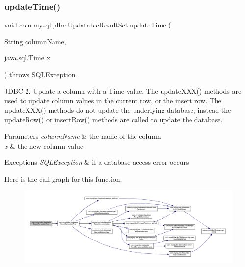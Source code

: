 \subsubsection{\texorpdfstring{update\+Time()}{updateTime()}\hspace{0.1cm}{\footnotesize\ttfamily [2/2]}}
{\footnotesize\ttfamily void com.\+mysql.\+jdbc.\+Updatable\+Result\+Set.\+update\+Time (\begin{DoxyParamCaption}\item[{String}]{column\+Name,  }\item[{java.\+sql.\+Time}]{x }\end{DoxyParamCaption}) throws S\+Q\+L\+Exception}

J\+D\+BC 2. Update a column with a Time value. The update\+X\+X\+X() methods are used to update column values in the current row, or the insert row. The update\+X\+X\+X() methods do not update the underlying database, instead the \mbox{\hyperlink{classcom_1_1mysql_1_1jdbc_1_1_updatable_result_set_a919969ba4b3c7cbc7b18605e9f31a746}{update\+Row()}} or \mbox{\hyperlink{classcom_1_1mysql_1_1jdbc_1_1_updatable_result_set_aef041f8d9d0778083716fc26652648fa}{insert\+Row()}} methods are called to update the database.


\begin{DoxyParams}{Parameters}
{\em column\+Name} & the name of the column \\
\hline
{\em x} & the new column value\\
\hline
\end{DoxyParams}

\begin{DoxyExceptions}{Exceptions}
{\em S\+Q\+L\+Exception} & if a database-\/access error occurs \\
\hline
\end{DoxyExceptions}
Here is the call graph for this function\+:
\nopagebreak
\begin{figure}[H]
\begin{center}
\leavevmode
\includegraphics[width=350pt]{classcom_1_1mysql_1_1jdbc_1_1_updatable_result_set_a92f4018fe4868d05817bfe39a711fe79_cgraph}
\end{center}
\end{figure}
\mbox{\label{classcom_1_1mysql_1_1jdbc_1_1_updatable_result_set_ac64644e427b3351770c30753ad0d9bbd}} 
